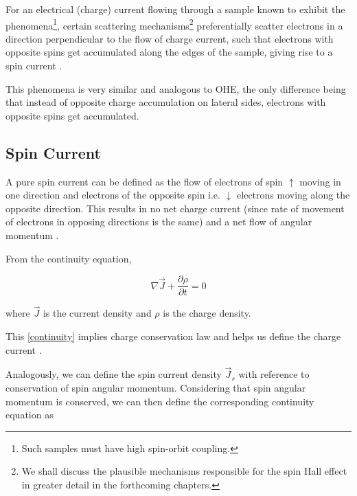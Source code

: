 
For an electrical (charge) current flowing through a sample known to exhibit the phenomena\footnote{Such samples must have high spin-orbit coupling.}, certain scattering mechanisms\footnote{We shall discuss the plausible mechanisms responsible for the spin Hall effect in greater detail in the forthcoming chapters.} preferentially scatter electrons in a direction perpendicular to the flow of charge current, such that electrons with opposite spins get accumulated along the edges of the sample, giving rise to a spin current \cite{dyakonov1971current,hirsch1999spin}.

This phenomena is very similar and analogous to OHE, the only difference being that instead of opposite charge accumulation on lateral sides, electrons with opposite spins get accumulated.

\subsection{Spin Current}

\label{subsec:spin-current}

A pure spin current can be defined as the flow of electrons of spin $ \uparrow $ moving in one direction and electrons of the opposite spin i.e. $ \downarrow $ electrons moving along the opposite direction.
This results in no net charge current (since rate of movement of electrons in opposing directions is the same) and a net flow of angular momentum \cite{krishnan2016fundamentals}.

From the continuity equation,

\begin{equation} \label{continuity}
    \nabla \vec{J} + \frac{\partial \rho}{\partial t} = 0
\end{equation}

where $ \vec{J} $ is the current density and $ \rho $ is the charge density.

This \cref{continuity} implies charge conservation law and helps us define the charge current \cite{jackson1999classical}.

Analogously, we can define the spin current density $ \vec{J}_s $ with reference to conservation of spin angular momentum. Considering that spin angular momentum is conserved, we can then define the corresponding continuity equation as

